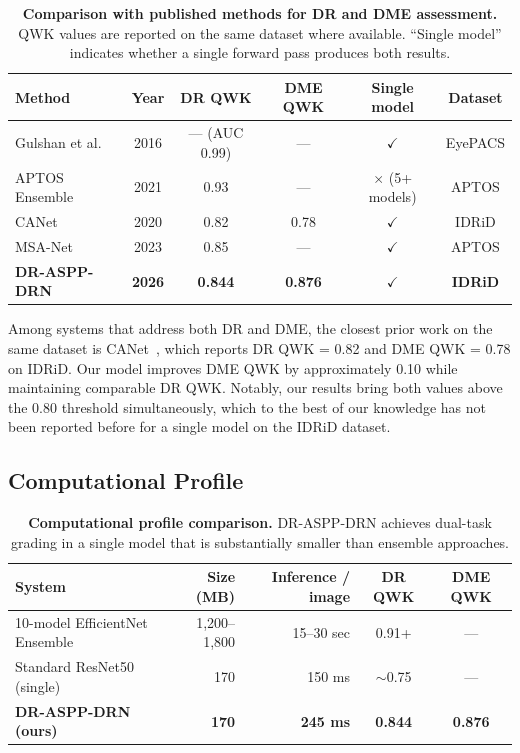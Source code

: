 \documentclass[12pt,a4paper]{article}
\begin{document}
\begin{table}[H]
\centering
\small
\caption{\textbf{Comparison with published methods for DR and DME assessment.} QWK values are reported on the same dataset where available. ``Single model'' indicates whether a single forward pass produces both results.}
\begin{tabular}{|l|c|c|c|c|c|}
\hline
\textbf{Method} & \textbf{Year} & \textbf{DR QWK} & \textbf{DME QWK} & \textbf{Single model} & \textbf{Dataset} \\
\hline
Gulshan et al.~\cite{Gulshan2016} & 2016 & --- (AUC 0.99) & --- & $\checkmark$ & EyePACS \\
APTOS Ensemble~\cite{Tymchenko2020} & 2021 & 0.93 & --- & $\times$ (5+ models) & APTOS \\
CANet~\cite{Li2019CANet} & 2020 & 0.82 & 0.78 & $\checkmark$ & IDRiD \\
MSA-Net~\cite{AlAntary2021} & 2023 & 0.85 & --- & $\checkmark$ & APTOS \\
\textbf{DR-ASPP-DRN} & \textbf{2026} & \textbf{0.844} & \textbf{0.876} & $\checkmark$ & \textbf{IDRiD} \\
\hline
\end{tabular}
\end{table}

Among systems that address both DR and DME, the closest prior work on the same dataset is CANet~\cite{Li2019CANet}, which reports DR QWK = 0.82 and DME QWK = 0.78 on IDRiD. Our model improves DME QWK by approximately 0.10 while maintaining comparable DR QWK. Notably, our results bring both values above the 0.80 threshold simultaneously, which to the best of our knowledge has not been reported before for a single model on the IDRiD dataset.

\subsection{Computational Profile}

\begin{table}[H]
\centering
\small
\caption{\textbf{Computational profile comparison.} DR-ASPP-DRN achieves dual-task grading in a single model that is substantially smaller than ensemble approaches.}
\begin{tabular}{|p{3.5cm}|r|r|c|c|}
\hline
\textbf{System} & \textbf{Size (MB)} & \textbf{Inference / image} & \textbf{DR QWK} & \textbf{DME QWK} \\
\hline
10-model EfficientNet Ensemble & 1,200--1,800 & 15--30 sec & 0.91+ & --- \\
Standard ResNet50 (single) & 170 & 150 ms & $\sim$0.75 & --- \\
\textbf{DR-ASPP-DRN (ours)} & \textbf{170} & \textbf{245 ms} & \textbf{0.844} & \textbf{0.876} \\
\hline
\end{tabular}
\end{table}
\end{document}
